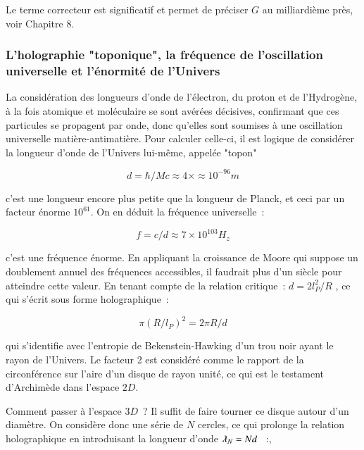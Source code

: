 \documentclass[a4paper,12pt]{article}
\begin{document}
 
Le terme correcteur est significatif et permet de préciser $G$ au milliardième près, voir Chapitre 8.
 


\subsubsection {L'holographie "toponique", la fréquence de l'oscillation universelle et l'énormité de l'Univers}

       La considération des longueurs d'onde de l'électron, du proton et de l'Hydrogène, à la fois atomique et moléculaire se sont avérées décisives, confirmant que ces particules se propagent par onde, donc qu'elles sont soumises à une oscillation universelle matière-antimatière. Pour calculer celle-ci, il est logique de considérer la longueur d'onde de l'Univers lui-même, appelée "topon" 


\begin{equation}
d = \hbar/Mc  \approx 4\times \approx 10^{-96} m 
\end{equation}


c'est une longueur encore plus petite que la longueur de Planck, et ceci par un facteur énorme $10^{61}$. On en déduit la fréquence universelle : 


\begin{equation}
f = c/d \approx  7 \times 10^{103} H_z
\end{equation}

c'est une fréquence énorme. En appliquant la croissance de Moore qui suppose un doublement annuel des fréquences accessibles, il faudrait plus d'un siècle pour atteindre cette valeur.
     En tenant compte de la relation critique : $d = 2l_P^2/R$ , ce qui s'écrit sous forme holographique :

\begin{equation}
\pi(R/l_P)^2 = 2 \pi R/d 
\end{equation}


qui s'identifie avec l'entropie de Bekenstein-Hawking d'un trou noir ayant le rayon de l'Univers. Le facteur 2 est considéré comme le rapport de la circonférence sur l'aire d'un disque de rayon unité, ce qui est le testament d'Archimède dans l'espace $2D$.


      Comment passer à l'espace $3D$ ? Il suffit de faire tourner ce disque autour d'un diamètre. On considère donc une série de $N$ cercles, ce qui prolonge la relation holographique en introduisant la longueur d'onde $\lambdabar_N = N d$  :,
\end{document}
